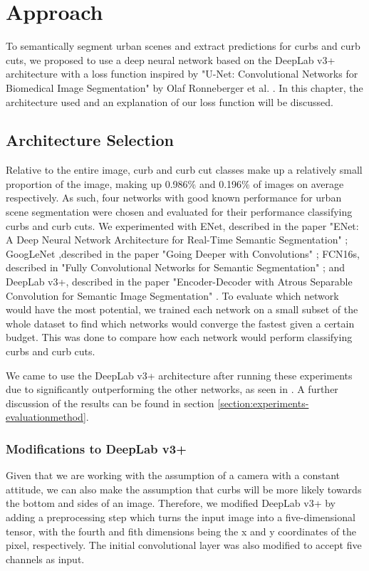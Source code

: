 \chapter{Approach}\label{chap:approach}
To semantically segment urban scenes and extract predictions for curbs and curb cuts, we proposed to use a deep neural network based on the DeepLab v3+ architecture with a loss function inspired by "U-Net: Convolutional Networks for Biomedical Image Segmentation" by Olaf Ronneberger et al. \cite{unet}.
In this chapter, the architecture used and an explanation of our loss function will be discussed.

\section{Architecture Selection} \label{section:approach-architectureselection}
Relative to the entire image, curb and curb cut classes make up a relatively small proportion of the image, making up 0.986\% and 0.196\% of images on average respectively.
As such, four networks with good known performance for urban scene segmentation were chosen and evaluated for their performance classifying curbs and curb cuts.
We experimented with ENet, described in the paper "ENet: A Deep Neural Network Architecture for Real-Time Semantic Segmentation" \cite{enet}; GoogLeNet ,described in the paper "Going Deeper with Convolutions" \cite{googlenet}; FCN16s, described in "Fully Convolutional Networks for Semantic Segmentation" \cite{fcn}; and DeepLab v3+, described in the paper "Encoder-Decoder with Atrous Separable Convolution for Semantic Image Segmentation" \cite{deeplab}.
To evaluate which network would have the most potential, we trained each network on a small subset of the whole dataset to find which networks would converge the fastest given a certain budget.
This was done to compare how each network would perform classifying curbs and curb cuts.

We came to use the DeepLab v3+ architecture after running these experiments due to significantly outperforming the other networks, as seen in . A further discussion of the results can be found in section \ref{section:experiments-evaluationmethod}.

\subsection{Modifications to DeepLab v3+}\label{section:approach-extendingdeeplab}
Given that we are working with the assumption of a camera with a constant attitude, we can also make the assumption that curbs will be more likely towards the bottom and sides of an image.
Therefore, we modified DeepLab v3+ by adding a preprocessing step which turns the input image into a five-dimensional tensor, with the fourth and fith dimensions being the x and y coordinates of the pixel, respectively.
The initial convolutional layer was also modified to accept five channels as input.


